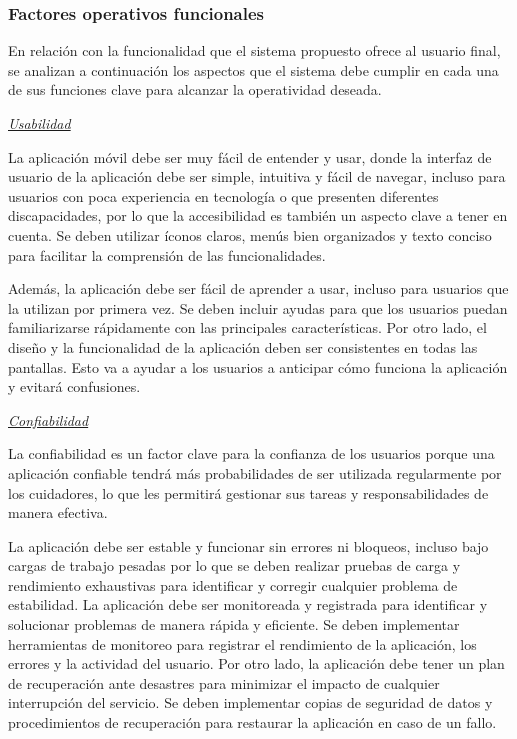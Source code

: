 \documentclass[a4paper,12pt]{article}
\newcommand{\saltolinea}{\par\vspace{\baselineskip}}
\begin{document}
    \subsubsection{Factores operativos funcionales}
    \par En relación con la funcionalidad que el sistema propuesto ofrece al usuario final, se analizan a continuación los aspectos que el sistema debe cumplir en cada una de sus funciones clave para alcanzar la operatividad deseada.
    \saltolinea
    \par \textit{\underline{Usabilidad}}
    \saltolinea
    \par La aplicación móvil debe ser muy fácil de entender y usar, donde la interfaz de usuario de la aplicación debe ser simple, intuitiva y fácil de navegar, incluso para usuarios con poca experiencia en tecnología o que presenten diferentes discapacidades, por lo que la accesibilidad es también un aspecto clave a tener en cuenta. Se deben utilizar íconos claros, menús bien organizados y texto conciso para facilitar la comprensión de las funcionalidades. 
    \par Además, la aplicación debe ser fácil de aprender a usar, incluso para usuarios que la utilizan por primera vez. Se deben incluir ayudas para que los usuarios puedan familiarizarse rápidamente con las principales características. Por otro lado, el diseño y la funcionalidad de la aplicación deben ser consistentes en todas las pantallas. Esto va a ayudar a los usuarios a anticipar cómo funciona la aplicación y evitará confusiones.
    \saltolinea
    \par \textit{\underline{Confiabilidad}} 
    \saltolinea
    \par La confiabilidad es un factor clave para la confianza de los usuarios porque una aplicación confiable tendrá más probabilidades de ser utilizada regularmente por los cuidadores, lo que les permitirá gestionar sus tareas y responsabilidades de manera efectiva.
    \par La aplicación debe ser estable y funcionar sin errores ni bloqueos, incluso bajo cargas de trabajo pesadas por lo que se deben realizar pruebas de carga y rendimiento exhaustivas para identificar y corregir cualquier problema de estabilidad. La aplicación debe ser monitoreada y registrada para identificar y solucionar problemas de manera rápida y eficiente. Se deben implementar herramientas de monitoreo para registrar el rendimiento de la aplicación, los errores y la actividad del usuario. Por otro lado, la aplicación debe tener un plan de recuperación ante desastres para minimizar el impacto de cualquier interrupción del servicio. Se deben implementar copias de seguridad de datos y procedimientos de recuperación para restaurar la aplicación en caso de un fallo.
\end{document}
